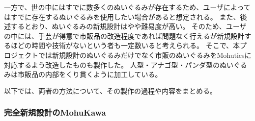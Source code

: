 \documentclass[uplatex,a4paper,12pt]{jsarticle}
\begin{document}
一方で、世の中にはすでに数多くのぬいぐるみが存在するため、ユーザによってはすでに存在するぬいぐるみを使用したい場合があると想定される。
また、後述するとおり、ぬいぐるみの新規設計はやや難易度が高い。
そのため、ユーザの中には、手芸が得意で市販品の改造程度であれば問題なく行えるが新規設計するほどの時間や技術がないという者も一定数いると考えられる。
そこで、本プロジェクトでは新規設計のぬいぐるみだけでなく市販のぬいぐるみをMohuticsに対応するよう改造したものも製作した。
人型・アナゴ型・パンダ型のぬいぐるみは市販品の内部をくり貫くように加工している。

以下では、両者の方法について、その製作の過程や内容をまとめる。

\subsubsection{完全新規設計のMohuKawa}
\end{document}
